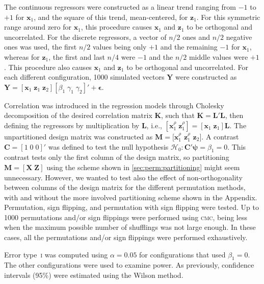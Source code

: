 The continuous regressors were constructed as a linear trend ranging from $-1$ to $+1$ for $\mathbf{x}_1$, and the square of this trend, mean-centered, for $\mathbf{z}_1$. For this symmetric range around zero for $\mathbf{x}_1$, this procedure causes $\mathbf{x}_1$ and $\mathbf{z}_1$ to be orthogonal and uncorrelated. For the discrete regressors, a vector of $n/2$ ones and $n/2$ negative ones was used, the first $n/2$ values being only $+1$ and the remaining $-1$ for $\mathbf{x}_1$, whereas for $\mathbf{z}_1$, the first and last $n/4$ were $-1$ and the $n/2$ middle values were $+1$. This procedure also causes $\mathbf{x}_1$ and $\mathbf{z}_1$ to be orthogonal and uncorrelated. For each different configuration, 1000 simulated vectors $\mathbf{Y}$ were constructed as $\mathbf{Y}=[\mathbf{x}_{1} \; \mathbf{z}_{1} \; \mathbf{z}_{2}][\beta_1 \; \gamma_1 \; \gamma_2]'+\boldsymbol{\epsilon}$.

Correlation was introduced in the regression models through Cholesky decomposition of the desired correlation matrix $\mathbf{K}$, such that $\mathbf{K}=\mathbf{L}'\mathbf{L}$, then defining the regressors by multiplication by $\mathbf{L}$, i.e., $[\mathbf{x}_{1}^{\rho} \; \mathbf{z}_{1}^{\rho}] = [\mathbf{x}_{1} \; \mathbf{z}_{1}]\mathbf{L}$. The unpartitioned design matrix was constructed as $\mathbf{M}=[\mathbf{x}_{1}^{\rho}$  $\mathbf{z}_{1}^{\rho}$ $\mathbf{z}_{2}]$. A contrast $\mathbf{C}=[1 \; 0 \; 0]'$ was defined to test the null hypothesis $\mathcal{H}_{0} : \mathbf{C}'\boldsymbol{\psi} = \beta_{1} = 0$. This contrast tests only the first column of the design matrix, so partitioning $\mathbf{M}=[\mathbf{X} \; \mathbf{Z}]$ using the scheme shown in \ref{sec:perm:partitioning} might seem unnecessary. However, we wanted to test also the effect of non-orthogonality between columns of the design matrix for the different permutation methods, with and without the more involved partitioning scheme shown in the Appendix. Permutation, sign flipping, and permutation with sign flipping were tested. Up to 1000 permutations and/or sign flippings were performed using \textsc{cmc}, being less when the maximum possible number of shufflings was not large enough. In these cases, all the permutations and/or sign flippings were performed exhaustively.

Error type~\textsc{i} was computed using $\alpha=0.05$ for configurations that used $\beta_{1}=0$. The other configurations were used to examine power. As previously, confidence intervals (95\%) were estimated using the Wilson method.

